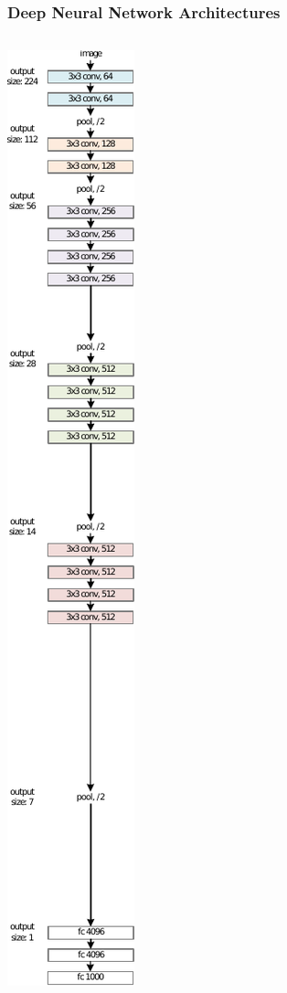 \documentclass[english,usenames,dvipsnames]{beamer}
\begin{document}
\begin{frame}
	\frametitle{Deep Neural Network Architectures}
	\begin{columns}
		\begin{column}{0.3\textwidth}
			\centering
			\includegraphics[scale=0.37]{VGG.pdf}

\end{column}
\end{columns}
\end{frame}
\end{document}
